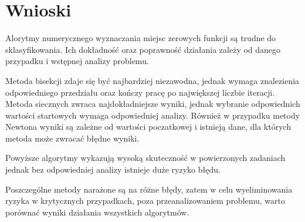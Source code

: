 \documentclass{article}
\begin{document}
\section{Wnioski}

Alorytmy numerycznego wyznaczania miejsc zerowych funkcji są trudne do sklasyfikowania.
Ich dokładność oraz poprawność działania zależy od danego przypadku i wstępnej analizy problemu.

Metoda bisekcji zdaje się być najbardziej niezawodna, jednak wymaga znalezienia odpowiedniego przedziału oraz kończy pracę po największej liczbie iteracji.
Metoda siecznych zwraca najdokładniejsze wyniki, jednak wybranie odpowiednich wartości startowych wymaga odpowiedniej analizy.
Również w przypadku metody Newtona wyniki są zależne od wartości poczatkowej i istnieją dane, dla których metoda może zwracać błędne wyniki.

Powyższe algorytmy wykazują wysoką skuteczność w powierzonych zadaniach jednak bez odpowiedniej analizy istnieje duże ryzyko błędu.

Poszczególne metody narażone są na różne błędy, zatem w celu wyeliminowania ryzyka w krytycznych przypadkach, poza przeanalizowaniem problemu, warto porównać wyniki działania wszystkich algorytmów.
\end{document}
